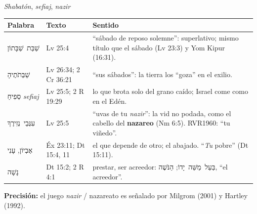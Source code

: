 \documentclass[hyperref={bookmarks=false},aspectratio=169]{beamer}
\newcommand{\heb}[1]{\mbox{\foreignlanguage{hebrew}{#1}}}
\newcommand{\destacar}[1]{\textbf{\textcolor{tierraroja}{#1}}}
\newcommand{\precision}[1]{{\footnotesize\color{sepia}\textbf{Precisión:} #1}}
\begin{document}
\begin{frame}{\emph{Shabatón}, \emph{sefiaj}, \emph{nazir}}
\scriptsize\renewcommand{\arraystretch}{1.18}
\begin{tabular}{@{}L{2.5cm}L{2.0cm}L{7.4cm}@{}}
\toprule
\textbf{Palabra} & \textbf{Texto} & \textbf{Sentido} \\ \midrule
\heb{שַׁבַּת שַׁבָּתוֹן} & Lv 25:4 & ``sábado de reposo solemne'': superlativo; mismo título que el sábado (Lv 23:3) y Yom Kipur (16:31). \\
\heb{שַׁבְּתֹתֶיהָ} & Lv 26:34; 2 Cr 36:21 & ``sus sábados'': la tierra los ``goza'' en el exilio. \\
\heb{סְפִיחַ} \emph{sefiaj} & Lv 25:5; 2 R 19:29 & lo que brota solo del grano caído; Israel come como en el Edén. \\
\heb{עִנְּבֵי נְזִירֶךָ} & Lv 25:5 & ``uvas de tu \emph{nazir}'': la vid no podada, como el cabello del \destacar{nazareo} (Nm 6:5). RVR1960: ``tu viñedo''. \\
\heb{אֶבְיוֹן}, \heb{עָנִי} & Éx 23:11; Dt 15:4, 11 & el que depende de otro; el abajado. ``\emph{Tu} pobre'' (Dt 15:11). \\
\heb{נָשָׁה} & Dt 15:2; 2 R 4:1 & prestar, ser acreedor: \heb{בַּעַל מַשֵּׁה יָדוֹ}; \heb{הַנֹּשֶׁה}, ``el acreedor''. \\
\bottomrule
\end{tabular}\par\medskip
\precision{el juego \emph{nazir} / nazareato es señalado por Milgrom (2001) y Hartley (1992).}
\end{frame}
\end{document}
